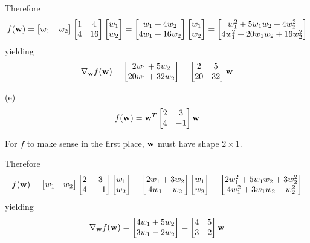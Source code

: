 \documentclass[a4paper, 12pt]{article}
\begin{document}
\begin{solution}
Therefore \[
f(\mathbf{w}) = \begin{bmatrix}
w_1 & w_2  
\end{bmatrix}
\begin{bmatrix}
    1 & 4 \\
    4 & 16
\end{bmatrix} \begin{bmatrix}
w_1 \\
w_2
\end{bmatrix} = \begin{bmatrix}
    w_1 + 4w_2 \\
    4w_1 + 16w_2
\end{bmatrix} \begin{bmatrix}
w_1 \\
w_2
\end{bmatrix} = \begin{bmatrix}
    w_1^2 + 5w_1w_2 + 4w_2^2 \\
    4w_1^2 + 20w_1w_2 + 16w_2^2
\end{bmatrix}
\]
yielding
\[
\nabla_{\mathbf{w}} f(\mathbf{w}) = \begin{bmatrix}
    2w_1 + 5w_2 \\
    20w_1 + 32w_2
\end{bmatrix} = \begin{bmatrix}
    2 & 5 \\
    20 & 32
\end{bmatrix} \mathbf{w}
\]

(e)
\[
f(\mathbf{w}) = \mathbf{w}^T \begin{bmatrix}
    2 & 3\\
    4 & -1
\end{bmatrix} \mathbf{w}
\]

For $f$ to make sense in the first place, $\mathbf{w}$ must have shape $2 \times 1$.

Therefore \[
f(\mathbf{w}) = \begin{bmatrix}
w_1 & w_2  
\end{bmatrix}
\begin{bmatrix}
    2 & 3 \\
    4 & -1
\end{bmatrix} \begin{bmatrix}
w_1 \\
w_2
\end{bmatrix} = \begin{bmatrix}
    2w_1 + 3w_2 \\
    4w_1 - w_2
\end{bmatrix} \begin{bmatrix}
w_1 \\
w_2
\end{bmatrix} = \begin{bmatrix}
    2w_1^2 + 5w_1w_2 + 3w_2^2 \\
    4w_1^2 + 3w_1w_2 - w_2^2
\end{bmatrix}
\]
yielding
\[
\nabla_{\mathbf{w}} f(\mathbf{w}) = \begin{bmatrix}
    4w_1 + 5w_2 \\
    3w_1 - 2w_2
\end{bmatrix} = \begin{bmatrix}
    4 & 5\\
    3 & 2
\end{bmatrix} \mathbf{w}
\]


\end{solution}
\end{document}
